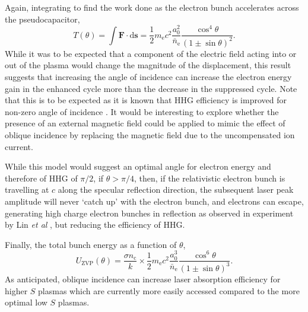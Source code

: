 Again, integrating to find the work done as the electron bunch accelerates across the pseudocapacitor,
\begin{equation}\label{eq:zvp_Tzvp_theta}
	T (\theta)=  \int \mathbf{F}\cdot\mathrm{d}\mathbf{s} = \frac{1}{2}m_\mathrm{e}c^2\frac{a^2_0}{\bar{n}_\mathrm{e}}\frac{\cos^4\theta}{(1\pm \sin\theta)^2}.
\end{equation}
While it was to be expected that a component of the electric field acting into or out of the plasma would change the magnitude of the displacement, this result suggests that increasing the angle of incidence can increase the electron energy gain in the enhanced cycle more than the decrease in the suppressed cycle. Note that this is to be expected as it is known that HHG efficiency is improved for non-zero angle of incidence \cite{gonoskovUltrarelativisticNanoplasmonicsRoute2011, edwardsXRayEmissionEffectiveness2020}. It would be interesting to explore whether the presence of an external magnetic field could be applied to mimic the effect of oblique incidence by replacing the magnetic field due to the uncompensated ion current.

While this model would suggest an optimal angle for electron energy and therefore of \ac{HHG} of $\pi/2$, if $\theta > \pi/4$, then, if the relativistic electron bunch is travelling at $c$ along the specular reflection direction, the subsequent laser peak amplitude will never `catch up' with the electron bunch, and electrons can escape, generating high charge electron bunches in reflection as observed in experiment by Lin \textit{et al }\cite{linIsolatedAttosecondElectron2020}, but reducing the efficiency of HHG.

Finally, the total bunch energy as a function of $\theta$,
\begin{equation}\label{eq:zvp_Uzvp_theta}
	U_\mathrm{ZVP}(\theta) = \frac{\sigma n_\mathrm{c}}{k}\times \frac{1}{2}m_\mathrm{e}c^2 \frac{a^3_0}{\bar{n}_\mathrm{e}}\frac{\cos^6\theta}{(1\pm \sin\theta)^3}.
\end{equation}
As anticipated, oblique incidence can increase laser absorption efficiency for higher $S$ plasmas which are currently more easily accessed compared to the more optimal low $S$ plasmas.

